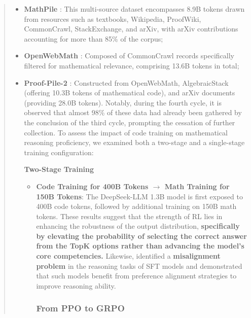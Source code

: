 \begin{abstract}
\begin{itemize}[topsep=0pt]
    \item \textbf{MathPile} \citep{mathpile}: This multi-source dataset encompasses 8.9B tokens drawn from resources such as textbooks, Wikipedia, ProofWiki, CommonCrawl, StackExchange, and arXiv, with arXiv contributions accounting for more than 85\% of the corpus;
    \item \textbf{OpenWebMath} \citep{openwebmath}: Composed of CommonCrawl records specifically filtered for mathematical relevance, comprising 13.6B tokens in total;
    \item \textbf{Proof-Pile-2} \citep{llemma}: Constructed from OpenWebMath, AlgebraicStack (offering 10.3B tokens of mathematical code), and arXiv documents (providing 28.0B tokens). Notably, during the fourth cycle, it is observed that almost 98\% of these data had already been gathered by the conclusion of the third cycle, prompting the cessation of further collection. To assess the impact of code training on mathematical reasoning proficiency, we examined both a two-stage and a single-stage training configuration:

\textbf{Two-Stage Training}

\begin{itemize}[topsep=0pt]
    \item \textbf{Code Training for 400B Tokens $\rightarrow$ Math Training for 150B Tokens}: The DeepSeek-LLM 1.3B model is first exposed to 400B code tokens, followed by additional training on 150B math tokens. These results suggest that the strength of RL lies in enhancing the robustness of the output distribution, \textbf{specifically by elevating the probability of selecting the correct answer from the TopK options rather than advancing the model’s core competencies.} Likewise, \citep{wang2023making} identified a \textbf{misalignment problem} in the reasoning tasks of SFT models and demonstrated that such models benefit from preference alignment strategies \citep{yuan2023rrhf,song2023preference,wang2023making} to improve reasoning ability. \subsubsection{From PPO to GRPO}


\end{itemize}
\end{itemize}
\end{abstract}
